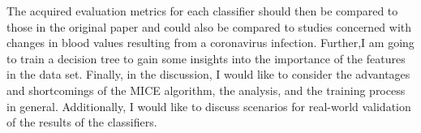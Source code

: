 \documentclass[12pt,a4paper,oneside]{article}
\newcommand{\comment}[1]{}
\begin{document}
The acquired evaluation metrics for each classifier should then be compared to those in the original paper and could also be compared to studies concerned with changes in blood values resulting from a coronavirus infection. Further,I am going to train a decision tree to gain some insights into the importance of the features in the data set. Finally, in the discussion, I would like to consider the advantages and shortcomings of the MICE algorithm, the analysis, and the training process in general. Additionally, I would like to discuss scenarios for real-world validation of the results of the classifiers.
\comment{
Additionally, I could discuss further ideas, such as the potential benefits and pitfalls in bootstrapping data using the original data set to improve the performance of the classifiers and scenarios for a real-world validation of the results.}
\printbibliography
\end{document}
